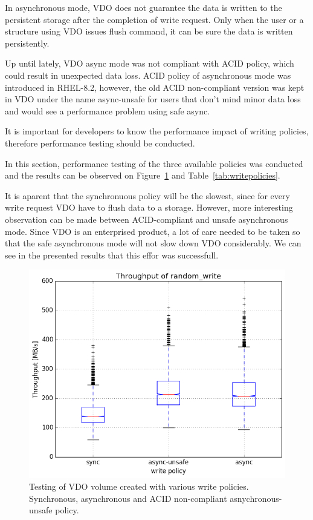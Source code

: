 \documentclass[
  color, %
  table, %
  lof,   %
  lot,   %
]{fithesis3}
\begin{document}
In asynchronous mode, VDO does not guarantee the data is written to the persistent storage after the completion of write request. Only when the user or a structure using VDO issues flush command, it can be sure the data is written persistently.

Up until lately, VDO async mode was not compliant with ACID policy, which could result in unexpected data loss. ACID policy of asynchronous mode was introduced in RHEL-8.2, however, the old ACID non-compliant version was kept in VDO under the name async-unsafe for users that don't mind minor data loss and would see a performance problem using safe async.

It is important for developers to know the performance impact of writing policies, therefore performance testing should be conducted.

In this section, performance testing of the three available policies was conducted and the results can be observed on Figure~\ref{fig:writepolicies} and Table~\ref{tab:writepolicies}.

It is aparent that the synchronuous policy will be the slowest, since for every write request VDO have to flush data to a storage. However, more interesting observation can be made between ACID-compliant and unsafe asynchronous mode. Since VDO is an enterprised product, a lot of care needed to be taken so that the safe asynchronous mode will not slow down VDO considerably. We can see in the presented results that this effor was successfull.

\begin{figure}[!htb]
        \centering
        \includegraphics[width=\textwidth]{../results/write_policies/report/random_write1_compare_boxplots}
\caption[Performance of various write policies]{Testing of VDO volume created with various write policies. Synchronous, asynchronous and ACID non-compliant asnychronous-unsafe policy.}
\label{fig:writepolicies}
\end{figure}
\end{document}

